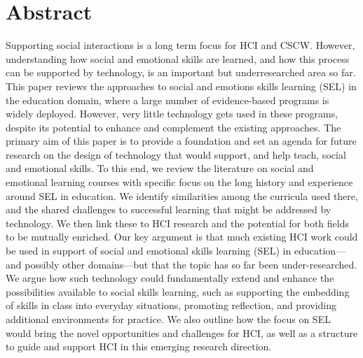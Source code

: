 \documentclass[prodmode,acmtochi]{acmsmall}
\begin{document}
\section*{Abstract} 
Supporting social interactions is a long term focus for HCI and CSCW. However, understanding how social and emotional skills are learned, and how this process can be supported by technology, is an important but underresearched area so far. 
% 
This paper reviews the approaches to social and emotions skills learning (SEL) in the education domain, where a large number of evidence-based programs is widely deployed. However, very little technology gets used in these programs, despite its potential to enhance and complement the existing approaches.  
%
%
The primary aim of this paper is to provide a foundation and set an agenda
for future research on the design of technology that would support, and help
teach, social and emotional skills. To this end, we review the literature on social and emotional learning courses with specific focus on the long history and experience around SEL in education. We identify similarities among the curricula used there, and the shared challenges to successful learning that might be addressed by technology. We then link these to HCI research and the potential for both fields to be mutually enriched. 
Our key argument is that much existing HCI work could be used in support of social and emotional skills learning (SEL) in education---and possibly other domains---but that the topic has so far been under-researched. We argue how such technology could fundamentally extend and enhance the possibilities available to social skills learning, such as supporting the embedding of skills in class into everyday situations, promoting reflection, and providing additional environments for practice. We also outline how the focus on SEL would bring the novel opportunities and challenges for HCI, as well as a structure to guide and support HCI in this emerging research direction. 
\end{document}
